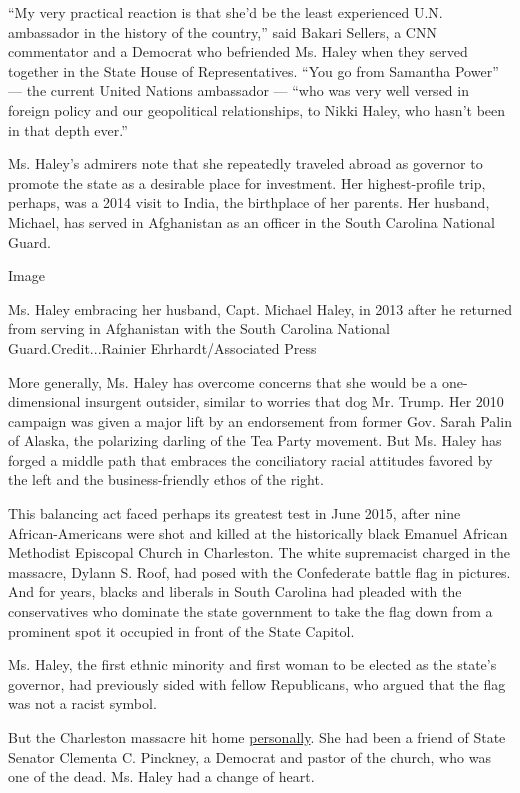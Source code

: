 ``My very practical reaction is that she'd be the least experienced U.N.
ambassador in the history of the country,'' said Bakari Sellers, a CNN
commentator and a Democrat who befriended Ms. Haley when they served
together in the State House of Representatives. ``You go from Samantha
Power'' --- the current United Nations ambassador --- ``who was very
well versed in foreign policy and our geopolitical relationships, to
Nikki Haley, who hasn't been in that depth ever.''

Ms. Haley's admirers note that she repeatedly traveled abroad as
governor to promote the state as a desirable place for investment. Her
highest-profile trip, perhaps, was a 2014 visit to India, the birthplace
of her parents. Her husband, Michael, has served in Afghanistan as an
officer in the South Carolina National Guard.

Image

Ms. Haley embracing her husband, Capt. Michael Haley, in 2013 after he
returned from serving in Afghanistan with the South Carolina National
Guard.Credit...Rainier Ehrhardt/Associated Press

More generally, Ms. Haley has overcome concerns that she would be a
one-dimensional insurgent outsider, similar to worries that dog Mr.
Trump. Her 2010 campaign was given a major lift by an endorsement from
former Gov. Sarah Palin of Alaska, the polarizing darling of the Tea
Party movement. But Ms. Haley has forged a middle path that embraces the
conciliatory racial attitudes favored by the left and the
business-friendly ethos of the right.

This balancing act faced perhaps its greatest test in June 2015, after
nine African-Americans were shot and killed at the historically black
Emanuel African Methodist Episcopal Church in Charleston. The white
supremacist charged in the massacre, Dylann S. Roof, had posed with the
Confederate battle flag in pictures. And for years, blacks and liberals
in South Carolina had pleaded with the conservatives who dominate the
state government to take the flag down from a prominent spot it occupied
in front of the State Capitol.

Ms. Haley, the first ethnic minority and first woman to be elected as
the state's governor, had previously sided with fellow Republicans, who
argued that the flag was not a racist symbol.

But the Charleston massacre hit home
\href{http://www.nytimes.com/2015/06/24/us/politics/south-carolina-governor-nikki-r-haley-points-to-personal-reasons-not-politics-for-shift-on-confederate-flag.html}{personally}.
She had been a friend of State Senator Clementa C. Pinckney, a Democrat
and pastor of the church, who was one of the dead. Ms. Haley had a
change of heart.

